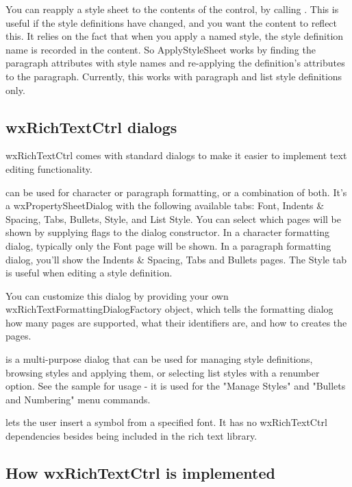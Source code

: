 You can reapply a style sheet to the contents of the control, by calling .
This is useful if the style definitions have changed, and you want the content to reflect this.
It relies on the fact that when you apply a named style, the style definition name is recorded in the
content. So ApplyStyleSheet works by finding the paragraph attributes with style names and re-applying the definition's
attributes to the paragraph. Currently, this works with paragraph and list style definitions only.

\subsection{wxRichTextCtrl dialogs}\label{wxrichtextctrldialogs}

wxRichTextCtrl comes with standard dialogs to make it easier to implement
text editing functionality.

 can be used
for character or paragraph formatting, or a combination of both. It's a wxPropertySheetDialog
with the following available tabs: Font, Indents \& Spacing, Tabs, Bullets, Style, and List Style.
You can select which pages will be shown by supplying flags to the dialog constructor.
In a character formatting dialog, typically only the Font page will be shown.
In a paragraph formatting dialog, you'll show the Indents \& Spacing, Tabs and Bullets
pages. The Style tab is useful when editing a style definition.

You can customize this dialog by providing your own wxRichTextFormattingDialogFactory
object, which tells the formatting dialog how many pages are supported, what their identifiers
are, and how to creates the pages.

 is a multi-purpose dialog
that can be used for managing style definitions, browsing styles and applying them, or selecting list styles with
a renumber option. See the sample for usage - it is used for the "Manage Styles" and "Bullets and Numbering"
menu commands.

 lets the user insert a symbol from
a specified font. It has no wxRichTextCtrl dependencies besides being included in
the rich text library.

\subsection{How wxRichTextCtrl is implemented}

